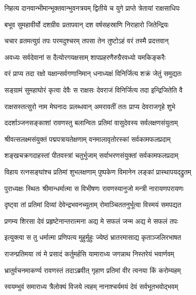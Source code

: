 \twolineshloka
{निहत्य दानवान्भीमान्भूक्तवान्भुवनत्रयम्}
{द्वितीये च युगे प्राप्ते त्रेतायां राक्षसाधिपः} %

\twolineshloka
{बभूव सुमहावीर्यो दशग्रीवः प्रतापवान्}
{दश वर्षसहस्राणि निराहारो जितेन्द्रियः} %

\twolineshloka
{चचार व्रतमत्युग्रं तपः परमदुश्चरम्}
{तपसा तेन तुष्टोऽहं वरं तस्मै प्रदत्तवान्} %

\twolineshloka
{अवध्यः सर्वदेवानां स दैत्योरगयक्षसाम्}
{शापप्रहरणैरुग्रैरवध्यो यमकिङ्करैः} %

\twolineshloka
{वरं प्राप्य तदा रक्षो यक्षान्सर्वगणानिमान्}
{धनाध्यक्षं विनिर्जित्य शक्रं जेतुं समुद्यतः} %

\twolineshloka
{सङ्ग्रामं सुमहाघोरं कृत्वा देवैः स राक्षसः}
{देवराजं विनिर्जित्य तदा इन्द्रिजितेति वै} %

\twolineshloka
{राक्षसस्तत्सुरो नाम मेघनादः प्रलब्धवान्}
{अमरावतीं ततः प्राप्य देवराजगृहे शुभे} %

\twolineshloka
{ददर्शाञ्जनसङ्काशां रावणस्तु बलान्वितः}
{प्रतिमां वासुदेवस्य सर्वलक्षणसंयुताम्} %

\twolineshloka
{श्रीवत्सलक्ष्मसंयुक्तं पद्मपत्रायतेक्षणाम्}
{वनमालावृतोरस्कां सर्वकामफलप्रदाम्} %

\twolineshloka
{शङ्खचक्रगदाहस्तां पीतवस्त्रां चतुर्भुजाम्}
{सर्वाभरणसंयुक्तां सर्वकामफलप्रदाम्} %

\twolineshloka
{विहाय रत्नसङ्घांश्च प्रतिमां शुभलक्षणाम्}
{पुष्पकेण विमानेन लङ्कां प्रास्थापयद्‌द्रुतम्} %

\twolineshloka
{पुराध्यक्षः स्थितः श्रीमान्धर्मात्मा स विभीषणः}
{रावणस्यानुजो मन्त्री नारायणपरायणः} %

\twolineshloka
{दृष्ट्वा तां प्रतिमां दिव्यां देवेन्द्रभवनच्युताम्}
{रोमाञ्चिततनुर्भूत्वा विस्मयं समपद्यत} %

\twolineshloka
{प्रणम्य शिरसा देवं प्रहृष्टेनान्तरात्मना}
{अद्य मे सफलं जन्म अद्य मे सफलं तपः} %

\twolineshloka
{इत्युक्त्वा स तु धर्मात्मा प्रणिपत्य मुहुर्मुहुः }
{ज्येष्ठं भ्रातरमासाद्य कृताञ्जलिरभाषत} %

\twolineshloka
{राजन्प्रतिमया त्वं मे प्रसादं कर्तुमर्हसि}
{यामाराध्य जगन्नाथ निस्तरेयं भवार्णवम्} %

\twolineshloka
{भ्रातुर्वचनमाकर्ण्य रावणस्तं तदाऽब्रवीत्}
{गृहाण प्रतिमां वीर त्वनया किं करोम्यहम्} %

\twolineshloka
{स्वयम्भुवं समाराध्य त्रैलोक्यं विजये त्वहम्}
{नानाश्चर्यमयं देवं सर्वभूतभवोद्भवम्} %


